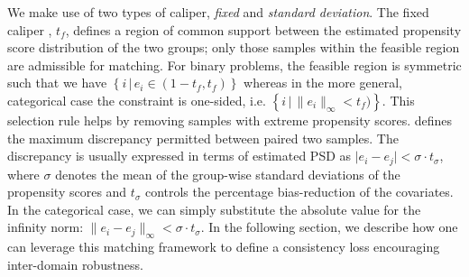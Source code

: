 We make use of two types of caliper, \emph{fixed} and \emph{standard deviation}. The fixed caliper
\cite{crump2009dealing}, $t_f$, defines a region of common support between the estimated propensity
score distribution of the two groups; only those samples within the feasible region are admissible
for matching. For binary problems, the feasible region is symmetric such that we have \( \left\{i
\, | \, e_i \in (1 - t_{f}, t_{f}) \right\} \) whereas in the more general, categorical case the
constraint is one-sided, i.e. \( \left\{i \, | \, \lVert e_i \rVert_{\infty} < t_{f}) \right\} \).
%
This selection rule helps by removing samples with extreme propensity scores.
%
\cite{rosenbaum1985constructing} defines the maximum discrepancy permitted between paired two samples.
%
The discrepancy is usually expressed in terms of estimated PSD as \( \vert e_i - e_j \vert < \sigma
\cdot t_\sigma \), where \(\sigma\) denotes the mean of the group-wise standard deviations of the
propensity scores and \(t_\sigma\) controls the percentage bias-reduction of the
covariates. 
%
In the categorical case, we can simply substitute the absolute value for the infinity norm: \(
\lVert e_i - e_j \rVert_\infty < \sigma \cdot t_\sigma \).
%
In the following section, we describe how one can leverage this matching framework to define a
consistency loss encouraging inter-domain robustness.
